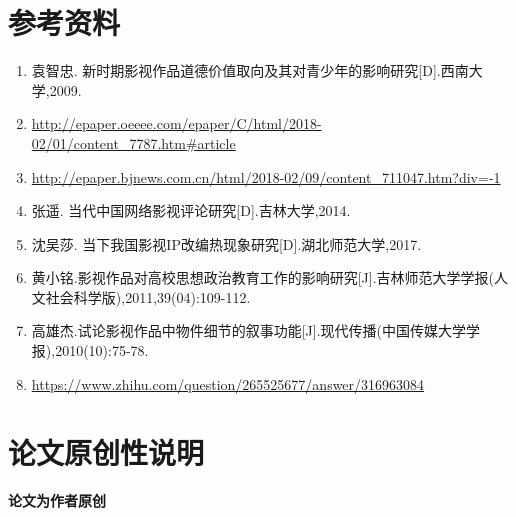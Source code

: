 \documentclass[12pt]{article}%
\begin{document}
\section{参考资料}
\begin{enumerate} [1 ]
  \item  袁智忠. 新时期影视作品道德价值取向及其对青少年的影响研究[D].西南大学,2009.
  \item  \url{http://epaper.oeeee.com/epaper/C/html/2018-02/01/content_7787.htm#article}
  \item  \url{http://epaper.bjnews.com.cn/html/2018-02/09/content_711047.htm?div=-1}
  \item 张遥. 当代中国网络影视评论研究[D].吉林大学,2014.
  \item  沈吴莎. 当下我国影视IP改编热现象研究[D].湖北师范大学,2017.
  \item  黄小铭.影视作品对高校思想政治教育工作的影响研究[J].吉林师范大学学报(人文社会科学版),2011,39(04):109-112.
  \item  高雄杰.试论影视作品中物件细节的叙事功能[J].现代传播(中国传媒大学学报),2010(10):75-78.
  \item   \url{https://www.zhihu.com/question/265525677/answer/316963084}
\end{enumerate}



\section{论文原创性说明}
\textbf{论文为作者原创}
\end{document}
